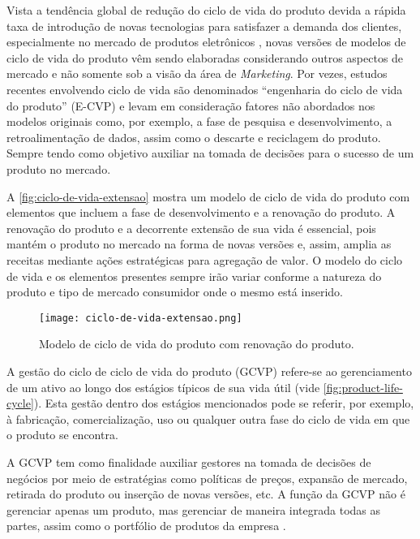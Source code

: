 Vista a tendência global de redução do ciclo de vida do produto devida a rápida taxa de introdução de novas tecnologias para satisfazer a demanda dos clientes, especialmente no mercado de produtos eletrônicos \cite{trappey2008lifecycle}, novas versões de modelos de ciclo de vida do produto vêm sendo elaboradas considerando outros aspectos de mercado e não somente sob a visão da área de \textit{Marketing}. Por vezes, estudos recentes envolvendo ciclo de vida são denominados ``engenharia do ciclo de vida do produto'' (E-CVP) \cite{cao2012lifecycle} e levam em consideração fatores não abordados nos modelos originais como, por exemplo, a fase de pesquisa e desenvolvimento, a retroalimentação de dados, assim como o descarte e reciclagem do produto. Sempre tendo como objetivo auxiliar na tomada de decisões para o sucesso de um produto no mercado.

A \autoref{fig:ciclo-de-vida-extensao} mostra um modelo de ciclo de vida do produto com elementos que incluem a fase de desenvolvimento e a renovação do produto. A renovação do produto e a decorrente extensão de sua vida é essencial, pois mantém o produto no mercado na forma de novas versões e, assim, amplia as receitas mediante ações estratégicas para agregação de valor. O modelo do ciclo de vida e os elementos presentes sempre irão variar conforme a natureza do produto e tipo de mercado consumidor onde o mesmo está inserido.

\begin{figure}[htb]
	\centering
	\texttt{[image: ciclo-de-vida-extensao.png]}
	\caption{Modelo de ciclo de vida do produto com renovação do produto.}
	\label{fig:ciclo-de-vida-extensao}
\end{figure}

A gestão do ciclo de ciclo de vida do produto (GCVP) refere-se ao gerenciamento de um ativo ao longo dos estágios típicos de sua vida útil (vide \autoref{fig:product-life-cycle}). Esta gestão dentro dos estágios mencionados pode se referir, por exemplo, à fabricação, comercialização, uso ou qualquer outra fase do ciclo de vida em que o produto se encontra.

A GCVP tem como finalidade auxiliar gestores na tomada de decisões de negócios por meio de estratégias como políticas de preços, expansão de mercado, retirada do produto ou inserção de novas versões, etc. A função da GCVP não é gerenciar apenas um produto, mas gerenciar de maneira integrada todas as partes, assim como o portfólio de produtos da empresa \cite{stark2015lifecycle}.


